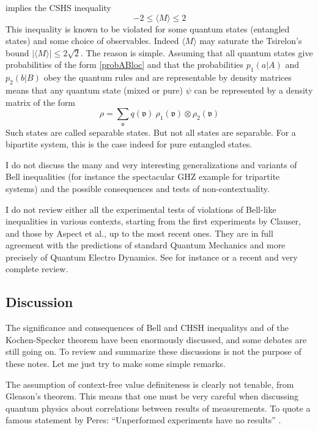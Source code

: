 implies the CSHS inequality
\begin{equation}
\label{CSHSineq}
-2\le \langle M\rangle\le  2
\end{equation}
This inequality is known to be violated for some quantum states (entangled states) and some choice of observables. Indeed $\langle M\rangle$ may saturate the Tsirelon's bound $|\langle M\rangle |\le 2\sqrt{2}$.
The reason is simple. Assuming that all quantum states give probabilities of the form  \ref{probABloc} and that the probabilities $p_1(a|A)$ and $p_2(b|B)$ obey the quantum rules and are representable by density matrices means that any quantum state (mixed or pure) $\psi $ can be represented by a density matrix of the form
\begin{equation}
\label{ }
\rho=\sum_{\mathfrak{v}} q(\mathfrak{v})\  \rho_1(\mathfrak{v}) \otimes \rho_2(\mathfrak{v})
\end{equation}
Such states are called separable states.
But not all states are  separable. 
 For a bipartite system, 
this is the case indeed for pure  entangled states.

I do not discuss the many and very interesting generalizations and variants of Bell inequalities (for instance the spectacular GHZ example for tripartite systems) and the possible consequences and tests of non-contextuality.


I do not review either all the experimental tests of violations of Bell-like inequalities in various contexts, starting from the first experiments by Clauser, and those by Aspect et al., up to the most recent ones. They are in full agreement with the predictions of standard Quantum Mechanics and more precisely of Quantum Electro Dynamics. See for instance \cite{Laloe-book} or a recent and very complete review. 

\subsection{Discussion}
\label{ssHVdisc}
The significance and consequences of Bell and CHSH inequalitys and of the Kochen-Specker theorem have been enormously discussed, and some debates are still going on. To review and summarize these discussions is not the purpose of these notes. 
Let me just try to make some simple remarks.

The assumption of context-free value definiteness is clearly not tenable, from Gleason's theorem. This means that one must be very careful when discussing quantum physics about correlations between results of measurements. To quote a famous statement by Peres: ``Unperformed experiments have no results''  \cite{Peres78}.

